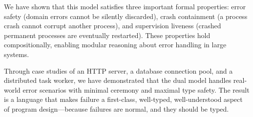 \documentclass[11pt,twocolumn]{article}
\begin{document}
We have shown that this model satisfies three important formal properties: error safety (domain errors cannot be silently discarded), crash containment (a process crash cannot corrupt another process), and supervision liveness (crashed permanent processes are eventually restarted). These properties hold compositionally, enabling modular reasoning about error handling in large systems.

Through case studies of an HTTP server, a database connection pool, and a distributed task worker, we have demonstrated that the dual model handles real-world error scenarios with minimal ceremony and maximal type safety. The result is a language that makes failure a first-class, well-typed, well-understood aspect of program design---because failures are normal, and they should be typed.



\end{document}
